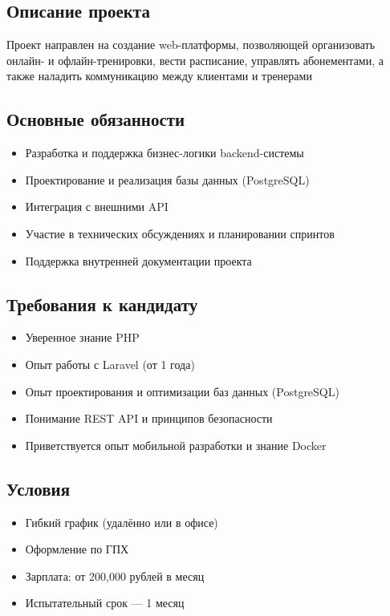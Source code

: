\documentclass[14pt, russian]{matmex-diploma-custom}
\begin{document}
\subsection{Описание проекта}
Проект направлен на создание web-платформы, позволяющей организовать онлайн- и офлайн-тренировки, вести расписание, управлять абонементами, а также наладить коммуникацию между клиентами и тренерами

\subsection{Основные обязанности}
\begin{itemize}
    \item Разработка и поддержка бизнес-логики backend-системы
    \item Проектирование и реализация базы данных (PostgreSQL)
    \item Интеграция с внешними API
    \item Участие в технических обсуждениях и планировании спринтов
    \item Поддержка внутренней документации проекта
\end{itemize}

\subsection{Требования к кандидату}
\begin{itemize}
    \item Уверенное знание PHP
    \item Опыт работы с Laravel (от 1 года)
    \item Опыт проектирования и оптимизации баз данных (PostgreSQL)
    \item Понимание REST API и принципов безопасности
    \item Приветствуется опыт мобильной разработки и знание Docker
\end{itemize}

\subsection{Условия}
\begin{itemize}
    \item Гибкий график (удалённо или в офисе)
    \item Оформление по ГПХ
    \item Зарплата: от 200,000 рублей в месяц
    \item Испытательный срок — 1 месяц
\end{itemize}
\end{document}

